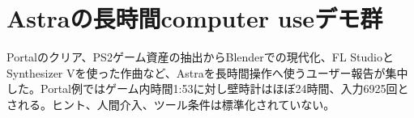 \section{Astraの長時間computer useデモ群}
Portalのクリア、PS2ゲーム資産の抽出からBlenderでの現代化、FL StudioとSynthesizer Vを使った作曲など、Astraを長時間操作へ使うユーザー報告が集中した。Portal例ではゲーム内時間1:53に対し壁時計はほぼ24時間、入力6925回とされる。ヒント、人間介入、ツール条件は標準化されていない。
